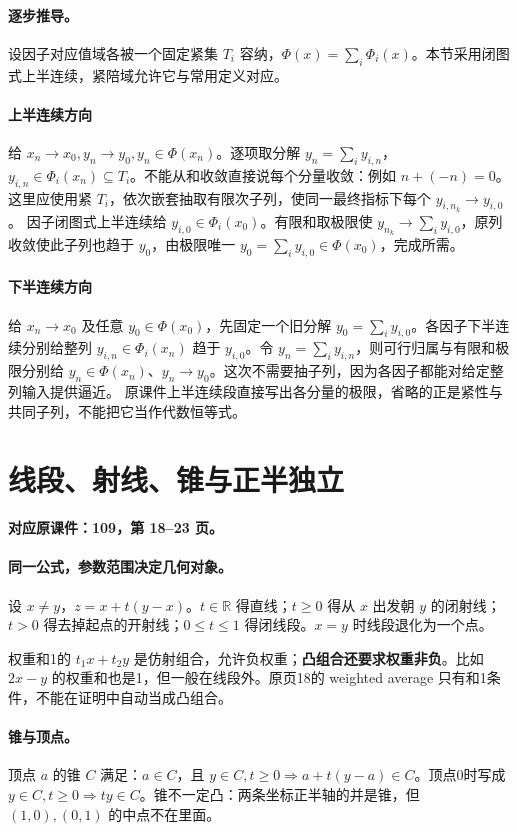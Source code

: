 \documentclass[11pt,a4paper]{article}
\newcommand{\R}{\mathbb{R}}\newcommand{\N}{\mathbb{N}}
\theoremstyle{definition}\newtheorem{definition}{定义}\newtheorem{example}{例}
\begin{document}
\paragraph{逐步推导。}
设因子对应值域各被一个固定紧集 $T_i$ 容纳，$\Phi(x)=\sum_i\Phi_i(x)$。本节采用闭图式上半连续，紧陪域允许它与常用定义对应。
\paragraph{上半连续方向}
给 $x_n\to x_0,y_n\to y_0,y_n\in\Phi(x_n)$。逐项取分解 $y_n=\sum_i y_{i,n}$，$y_{i,n}\in\Phi_i(x_n)\subseteq T_i$。不能从和收敛直接说每个分量收敛：例如 $n+(-n)=0$。这里应使用紧 $T_i$，依次嵌套抽取有限次子列，使同一最终指标下每个 $y_{i,n_k}\to y_{i,0}$。
因子闭图式上半连续给 $y_{i,0}\in\Phi_i(x_0)$。有限和取极限使 $y_{n_k}\to\sum_i y_{i,0}$，原列收敛使此子列也趋于 $y_0$，由极限唯一 $y_0=\sum_i y_{i,0}\in\Phi(x_0)$，完成所需。
\paragraph{下半连续方向}
给 $x_n\to x_0$ 及任意 $y_0\in\Phi(x_0)$，先固定一个旧分解 $y_0=\sum_i y_{i,0}$。各因子下半连续分别给整列 $y_{i,n}\in\Phi_i(x_n)$ 趋于 $y_{i,0}$。令 $y_n=\sum_i y_{i,n}$，则可行归属与有限和极限分别给 $y_n\in\Phi(x_n)$、$y_n\to y_0$。这次不需要抽子列，因为各因子都能对给定整列输入提供逼近。
原课件上半连续段直接写出各分量的极限，省略的正是紧性与共同子列，不能把它当作代数恒等式。


\clearpage\section{线段、射线、锥与正半独立}\label{g:109:18}

\textbf{对应原课件：109，第 18--23 页。}


\paragraph{同一公式，参数范围决定几何对象。}
设 $x\ne y$，$z=x+t(y-x)$。$t\in\R$ 得直线；$t\ge0$ 得从 $x$ 出发朝 $y$ 的闭射线；$t>0$ 得去掉起点的开射线；$0\le t\le1$ 得闭线段。$x=y$ 时线段退化为一个点。

权重和1的 $t_1x+t_2y$ 是仿射组合，允许负权重；\textbf{凸组合还要求权重非负}。比如 $2x-y$ 的权重和也是1，但一般在线段外。原页18的 weighted average 只有和1条件，不能在证明中自动当成凸组合。
\paragraph{锥与顶点。}
顶点 $a$ 的锥 $C$ 满足：$a\in C$，且 $y\in C,t\ge0\Rightarrow a+t(y-a)\in C$。顶点0时写成 $y\in C,t\ge0\Rightarrow ty\in C$。锥不一定凸：两条坐标正半轴的并是锥，但 $(1,0),(0,1)$ 的中点不在里面。
\end{document}
